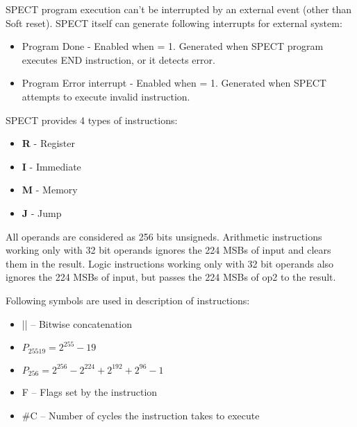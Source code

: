 \documentclass{tropic_design_spec}
\begin{document}

SPECT program execution can't be interrupted by an external event (other than
Soft reset). SPECT itself can generate following interrupts for external system:
\begin{itemize}
    \item{Program Done - Enabled when  = 1. Generated
                         when SPECT program executes END instruction, or it
                         detects error.}
    \item{Program Error interrupt - Enabled when  = 1.
                        Generated when SPECT attempts to execute invalid instruction.}
\end{itemize}




SPECT provides 4 types of instructions:
\begin{itemize}
    \item{\textbf{R} - Register}
    \item{\textbf{I} - Immediate}
    \item{\textbf{M} - Memory}
    \item{\textbf{J} - Jump}
\end{itemize}


All operands are considered as 256 bits unsigneds. Arithmetic instructions working only with 32 bit
operands ignores the 224 MSBs of input and clears them in the result. Logic instructions
working only with 32 bit operands also ignores the 224 MSBs of input, but passes the 224 MSBs of op2
to the result.





Following symbols are used in description of instructions:
\begin{itemize}
    \item{|| -- Bitwise concatenation}
    \item{$P_{25519} = 2^{255} - 19$}
    \item{$P_{256} = 2^{256} - 2^{224} + 2^{192} + 2^{96} - 1$}
    \item{F -- Flags set by the instruction}
    \item{\#C -- Number of cycles the instruction takes to execute}
\end{itemize}
\end{document}

